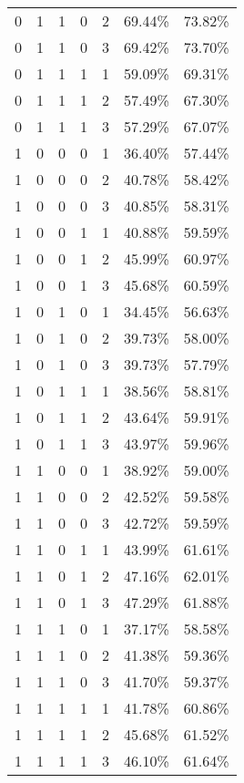 \begin{longtable}{rrrrrrr}
	0     & 1     & 1     & 0     & 2     & 69.44\% & 73.82\% \\
	0     & 1     & 1     & 0     & 3     & 69.42\% & 73.70\% \\
	0     & 1     & 1     & 1     & 1     & 59.09\% & 69.31\% \\
	0     & 1     & 1     & 1     & 2     & 57.49\% & 67.30\% \\
	0     & 1     & 1     & 1     & 3     & 57.29\% & 67.07\% \\
	1     & 0     & 0     & 0     & 1     & 36.40\% & 57.44\% \\
	1     & 0     & 0     & 0     & 2     & 40.78\% & 58.42\% \\
	1     & 0     & 0     & 0     & 3     & 40.85\% & 58.31\% \\
	1     & 0     & 0     & 1     & 1     & 40.88\% & 59.59\% \\
	1     & 0     & 0     & 1     & 2     & 45.99\% & 60.97\% \\
	1     & 0     & 0     & 1     & 3     & 45.68\% & 60.59\% \\
	1     & 0     & 1     & 0     & 1     & 34.45\% & 56.63\% \\
	1     & 0     & 1     & 0     & 2     & 39.73\% & 58.00\% \\
	1     & 0     & 1     & 0     & 3     & 39.73\% & 57.79\% \\
	1     & 0     & 1     & 1     & 1     & 38.56\% & 58.81\% \\
	1     & 0     & 1     & 1     & 2     & 43.64\% & 59.91\% \\
	1     & 0     & 1     & 1     & 3     & 43.97\% & 59.96\% \\
	1     & 1     & 0     & 0     & 1     & 38.92\% & 59.00\% \\
	1     & 1     & 0     & 0     & 2     & 42.52\% & 59.58\% \\
	1     & 1     & 0     & 0     & 3     & 42.72\% & 59.59\% \\
	1     & 1     & 0     & 1     & 1     & 43.99\% & 61.61\% \\
	1     & 1     & 0     & 1     & 2     & 47.16\% & 62.01\% \\
	1     & 1     & 0     & 1     & 3     & 47.29\% & 61.88\% \\
	1     & 1     & 1     & 0     & 1     & 37.17\% & 58.58\% \\
	1     & 1     & 1     & 0     & 2     & 41.38\% & 59.36\% \\
	1     & 1     & 1     & 0     & 3     & 41.70\% & 59.37\% \\
	1     & 1     & 1     & 1     & 1     & 41.78\% & 60.86\% \\
	1     & 1     & 1     & 1     & 2     & 45.68\% & 61.52\% \\
	1     & 1     & 1     & 1     & 3     & 46.10\% & 61.64\% \\
	\bottomrule
\end{longtable}%

